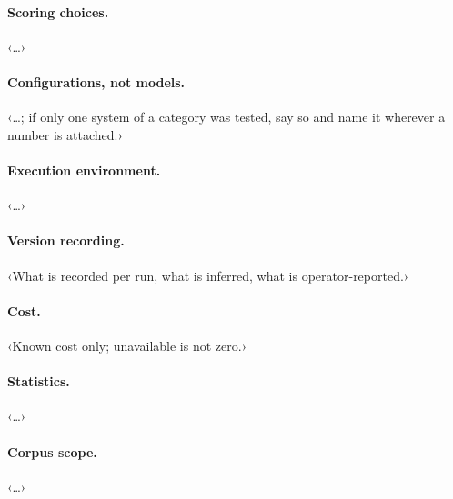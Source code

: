 \paragraph{Scoring choices.} ‹…›
\paragraph{Configurations, not models.} ‹…; if only one system of a category was tested, say so and name it wherever a number is attached.›
\paragraph{Execution environment.} ‹…›
\paragraph{Version recording.} ‹What is recorded per run, what is inferred, what is operator-reported.›
\paragraph{Cost.} ‹Known cost only; unavailable is not zero.›
\paragraph{Statistics.} ‹…›
\paragraph{Corpus scope.} ‹…›
